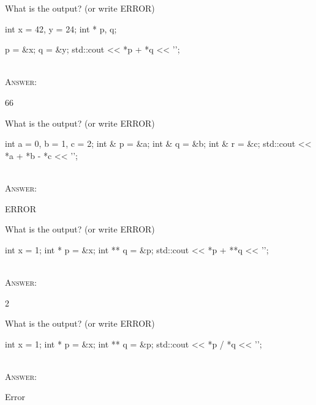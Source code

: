 

\renewcommand\AUTHOR{cadalebout1@cougars.ccis.edu} %


\topmattertwo


\nextq
What is the output? (or write ERROR)
\begin{console}[fontsize=\small]
int x = 42, y = 24;
int * p, q;

p = &x;
q = &y;
std::cout << *p + *q << '\n';
\end{console}
\\ \textsc{Answer:}\vspace{-2mm}
\begin{answercode}
66
\end{answercode}


\nextq
What is the output? (or write ERROR)
\begin{console}[fontsize=\small]
int a = 0, b = 1, c = 2;
int & p = &a;
int & q = &b;
int & r = &c;
std::cout << *a + *b - *c << '\n';
\end{console}
\\ \textsc{Answer:}\vspace{-2mm}
\begin{answercode}
ERROR
\end{answercode}


\nextq
What is the output? (or write ERROR)
\begin{console}[fontsize=\small]
int x = 1;
int * p = &x;
int ** q = &p;
std::cout << *p + **q << '\n';
\end{console}
\\ \textsc{Answer:}\vspace{-2mm}
\begin{answercode}
2
\end{answercode}

\nextq
What is the output? (or write ERROR)
\begin{console}[fontsize=\small]
int x = 1;
int * p = &x;
int ** q = &p;
std::cout << *p / *q << '\n';
\end{console}
\\ \textsc{Answer:}\vspace{-2mm}
\begin{answercode}
Error
\end{answercode}

